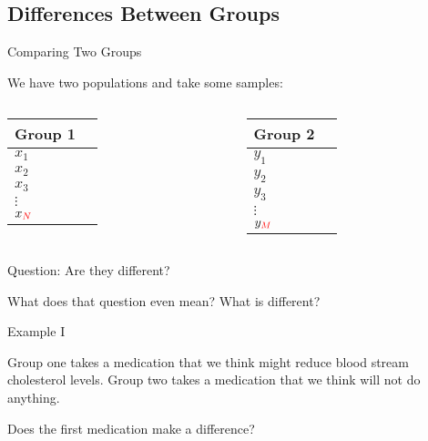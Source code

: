\subsection{Differences Between Groups}

\begin{frame}{Comparing Two Groups}

  We have two populations and take some samples: \\
  \begin{columns}
    \begin{tabular}{ll}
      Group 1 \\ \hline
      $x_1$  \\
      $x_2$  \\
      $x_3$  \\
      $\vdots$ \\
      $x_{{\color{red}N}}$  \\
    \end{tabular}
    \begin{tabular}{ll}
      Group 2 \\ \hline
      $y_1$ \\
      $y_2$ \\
      $y_3$ \\
      $\vdots$ \\
      $y_{{\color{red}M}}$ \\
    \end{tabular}
  \end{columns}

  \vfill

  Question: Are they different? 

  \vfill

  What does that question even mean? What is different?

  \vfill

\end{frame}

\begin{frame}{Example I}

  Group one takes a medication that we think might reduce blood stream
  cholesterol levels. Group two takes a medication that we think will
  not do anything.

  \vfill

  Does the first medication make a difference?

  \vfill

  
\end{frame}

